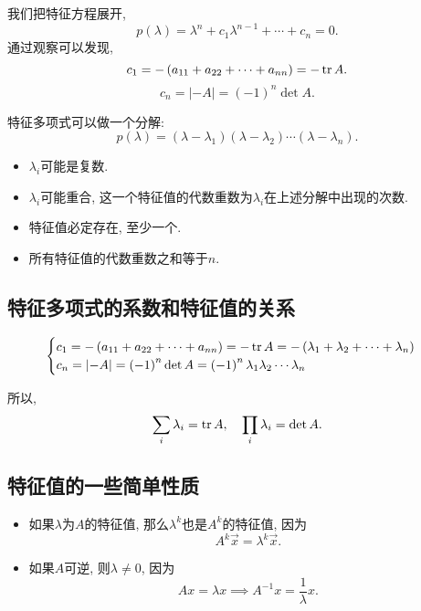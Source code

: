 我们把特征方程展开, 
\begin{equation}
  p\left( \lambda \right) = \lambda ^{n} + c_1 \lambda ^{n-1} + \cdots + c_n = 0.
\end{equation}
通过观察可以发现,
\begin{equation}
    c_1 = - \left( a_{11} + a_{22} + \cdots + a_{nn} \right) = - \tr A.
\end{equation}
\begin{equation}
    c_n = \left| -A \right| = \left( -1 \right) ^{n} \det A.
\end{equation}

特征多项式可以做一个分解:
\begin{equation}
    p\left( \lambda \right) = \left( \lambda - \lambda_1 \right) \left( \lambda - \lambda_2 \right) \cdots \left( \lambda - \lambda_n \right).
\end{equation}
\begin{itemize}
    \item $\lambda_i$可能是复数.
    \item $\lambda_i$可能重合, 这一个特征值的代数重数为$\lambda_i$在上述分解中出现的次数.
    \item 特征值必定存在, 至少一个.
    \item 所有特征值的代数重数之和等于$n$.
\end{itemize}

\subsection{特征多项式的系数和特征值的关系}
\begin{equation}
    \begin{cases}
        c_1 = - \left( a_{11} + a_{22} + \cdots + a_{nn} \right) = - \tr A = - \left( \lambda_1 + \lambda_2 + \cdots + \lambda_n \right)
        \\
        c_n = \left| -A \right| = \left( -1 \right) ^{n} \det A = \left( -1 \right) ^{n} \lambda_1 \lambda_2 \cdots \lambda_n
    \end{cases}
\end{equation}

所以, 
\begin{equation}
  \sum_{i} \lambda_i = \tr A, \quad \prod_{i} \lambda_i = \det A.
\end{equation}

\subsection{特征值的一些简单性质}
\begin{itemize}
    \item 如果$\lambda$为$A$的特征值, 那么$\lambda^k$也是$A^k$的特征值, 因为
    \begin{equation}
        A^k \vec{x} = \lambda^k \vec{x}.
    \end{equation}

    \item 如果$A$可逆, 则$\lambda \neq 0$, 因为
    \begin{equation}
        A x = \lambda x \implies A^{-1} x = \frac{1}{\lambda} x.
    \end{equation}
\end{itemize}

